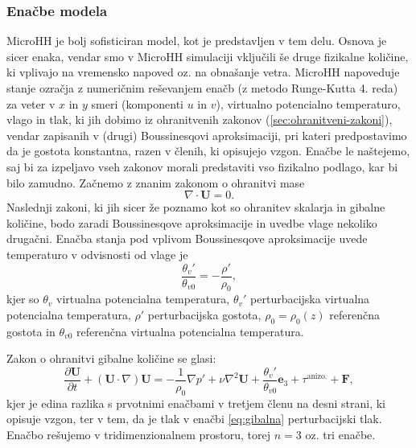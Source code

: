 \documentclass[mat2, tisk]{fmfdelo}
\begin{document}
\subsubsection{Enačbe modela}
MicroHH je bolj sofisticiran model, kot je predstavljen v tem delu. Osnova
je sicer enaka, vendar smo v MicroHH simulaciji vključili še druge 
fizikalne količine, ki vplivajo na vremensko napoved oz. na obnašanje 
vetra. 
MicroHH napoveduje stanje ozračja z numeričnim reševanjem enačb 
(z metodo Runge-Kutta 4. reda) za veter v $x$ in $y$ smeri (komponenti $u$ in $v$), virtualno potencialno temperaturo, 
vlago in tlak, ki jih dobimo iz ohranitvenih zakonov (\ref{sec:ohranitveni-zakoni}), vendar zapisanih v (drugi) 
Boussinesqovi aproksimaciji, pri kateri predpostavimo da je gostota 
konstantna, razen v členih, ki opisujejo vzgon. Enačbe le naštejemo, 
saj bi za izpeljavo vseh zakonov morali predstaviti vso fizikalno 
podlago, kar bi bilo zamudno. Začnemo z znanim zakonom o 
ohranitvi mase 
$$
\nabla \cdot \textbf{U} = 0.
$$
Naslednji zakoni, ki jih sicer že poznamo kot so ohranitev skalarja in
gibalne količine, bodo zaradi Boussinesqove aproksimacije in uvedbe vlage nekoliko drugačni. 
Enačba stanja pod vplivom Boussinesqove aproksimacije uvede temperaturo v odvisnosti od vlage je 
\begin{equation}
\frac{\theta_v'}{\theta_{v0}} = - \frac{\rho'}{\rho_0},
\end{equation}
kjer so $\theta_v$ virtualna potencialna temperatura, $\theta_v'$ 
perturbacijska virtualna potencialna temperatura, $\rho'$ 
perturbacijska gostota, $\rho_0 = \rho_0(z)$ referenčna gostota in 
$\theta_{v0}$ referenčna virtualna potencialna temperatura.

Zakon o ohranitvi gibalne količine se glasi:
\begin{equation}
\label{eq:gibalna}
\frac{\partial \textbf{U}}{\partial t} + (\textbf{U} \cdot \nabla)\textbf{U} = -\frac{1}{\rho_0}\nabla p' + \nu \nabla^2 \textbf{U} + \frac{\theta_v'}{\theta_{v0}} \textbf{e}_3 + \tau^{\text{anizo.}} + \textbf{F},
\end{equation}
kjer je edina razlika s prvotnimi enačbami v tretjem členu na desni strani, ki opisuje vzgon,
ter v tem, da je tlak v enačbi \eqref{eq:gibalna} perturbacijski tlak. Enačbo rešujemo v tridimenzionalnem prostoru, 
torej $n=3$ oz. tri enačbe. 
\end{document}
